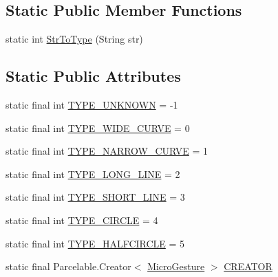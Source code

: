 \subsection*{Static Public Member Functions}
\begin{DoxyCompactItemize}
\item 
static int \hyperlink{classch_1_1zhaw_1_1ba10__bsha__1_1_1service_1_1MicroGesture_ad0059e70f1b2eb1ec1876ece697bc871}{StrToType} (String str)
\end{DoxyCompactItemize}
\subsection*{Static Public Attributes}
\begin{DoxyCompactItemize}
\item 
static final int \hyperlink{classch_1_1zhaw_1_1ba10__bsha__1_1_1service_1_1MicroGesture_a5f903774e82629582f34b094f636cc07}{TYPE\_\-UNKNOWN} = -\/1
\item 
static final int \hyperlink{classch_1_1zhaw_1_1ba10__bsha__1_1_1service_1_1MicroGesture_ae0758406e65bb8e4620eae33908ee771}{TYPE\_\-WIDE\_\-CURVE} = 0
\item 
static final int \hyperlink{classch_1_1zhaw_1_1ba10__bsha__1_1_1service_1_1MicroGesture_a10ec4946fe85b4cce6759af9ed1af09f}{TYPE\_\-NARROW\_\-CURVE} = 1
\item 
static final int \hyperlink{classch_1_1zhaw_1_1ba10__bsha__1_1_1service_1_1MicroGesture_a7aa282efbebb6c0ed0fcce9ad05f0769}{TYPE\_\-LONG\_\-LINE} = 2
\item 
static final int \hyperlink{classch_1_1zhaw_1_1ba10__bsha__1_1_1service_1_1MicroGesture_a028fbfbef81cd5bfd3d2d456d7109ed2}{TYPE\_\-SHORT\_\-LINE} = 3
\item 
static final int \hyperlink{classch_1_1zhaw_1_1ba10__bsha__1_1_1service_1_1MicroGesture_ac8268cb939b8bae2cf1791b4bbeb422d}{TYPE\_\-CIRCLE} = 4
\item 
static final int \hyperlink{classch_1_1zhaw_1_1ba10__bsha__1_1_1service_1_1MicroGesture_aa2babf7288fba5f44c2fd20f29f49386}{TYPE\_\-HALFCIRCLE} = 5
\item 
static final Parcelable.Creator$<$ \hyperlink{classch_1_1zhaw_1_1ba10__bsha__1_1_1service_1_1MicroGesture}{MicroGesture} $>$ \hyperlink{classch_1_1zhaw_1_1ba10__bsha__1_1_1service_1_1MicroGesture_a017ccacff6d5f99fd9ee14943767feab}{CREATOR}
\end{DoxyCompactItemize}
